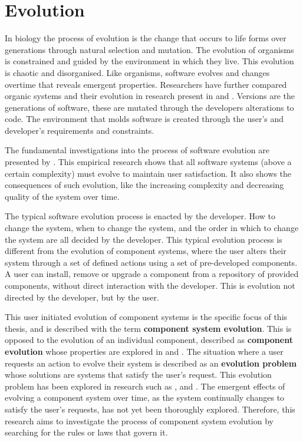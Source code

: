 \section{Evolution}
In biology the process of evolution is the change that occurs to life forms over generations through natural selection and mutation.
The evolution of organisms is constrained and guided by the environment in which they live.
This evolution is chaotic and disorganised.
Like organisms, software evolves and changes overtime that reveals emergent properties.
Researchers have further compared organic systems and their evolution in research present in \citep{Myers2003} and \citep{Yan2010}.
Versions are the generations of software, these are mutated through the developers alterations to code.
The environment that molds software is created through the user's and developer's requirements and constraints.

The fundamental investigations into the process of software evolution are presented by \citep{lehman1980}.
This empirical research shows that all software systems (above a certain complexity) must evolve to maintain user satisfaction.
It also shows the consequences of such evolution, like the increasing complexity and decreasing quality of the system over time.

The typical software evolution process is enacted by the developer.
How to change the system, when to change the system, and the order in which to change the system are all decided by the developer.
This typical evolution process is different from the evolution of component systems, 
where the user alters their system through a set of defined actions using a set of pre-developed components.
A user can install, remove or upgrade a component from a repository of provided components, without direct interaction with the developer.
This is evolution not directed by the developer, but by the user. 

This user initiated evolution of component systems is the specific focus of this thesis, and is described with the term \textbf{component system evolution}.
This is opposed to the evolution of an individual component, described as \textbf{component evolution} whose properties are explored in \citep{vasa2007patterns} and \citep{Stuckenholz2005}.
The situation where a user requests an action to evolve their system is described as an \textbf{evolution problem} whose solutions are systems that satisfy the user's request.
This evolution problem has been explored in research such as \citep{Ryan2005}, \citep{argelich2010solving} and \citep{di2010supporting}.
The emergent effects of evolving a component system over time, as the system continually changes to satisfy the user's requests, has not yet been thoroughly explored.
Therefore, this research aims to investigate the process of component system evolution by searching for the rules or laws that govern it.

